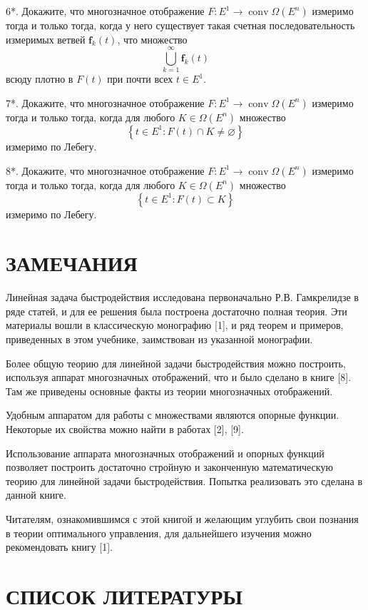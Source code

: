 \documentclass[8pt]{extarticle}
\begin{document}
6*. Докажите, что многозначное отображение \(F : E^1 \rightarrow \operatorname{conv}\Omega\left( E^n \right)\) измеримо тогда и только тогда, когда у него существует такая счетная последовательность измеримых ветвей \(\mathbf{f}_k(t)\), что множество
\[
\bigcup_{k=1}^{\infty}\mathbf{f}_k(t)
\]
всюду плотно в \(F(t)\) при почти всех \(t \in E^1\).

7*. Докажите, что многозначное отображение \(F : E^1 \rightarrow \operatorname{conv}\Omega\left( E^n \right)\) измеримо тогда и только тогда, когда для любого \(K \in \Omega\left( E^n \right)\) множество
\[
\left\{ t \in E^1 : F(t) \cap K \neq \varnothing \right\}
\]
измеримо по Лебегу.

8*. Докажите, что многозначное отображение \(F : E^1 \rightarrow \operatorname{conv}\Omega\left( E^n \right)\) измеримо тогда и только тогда, когда для любого \(K \in \Omega\left( E^n \right)\) множество
\[
\left\{ t \in E^1 : F(t) \subset K \right\}
\]
измеримо по Лебегу.

\section*{ЗАМЕЧАНИЯ}

Линейная задача быстродействия исследована первоначально Р.В. Гамкрелидзе в ряде статей, и для ее решения была построена достаточно полная теория. Эти материалы вошли в классическую монографию [1], и ряд теорем и примеров, приведенных в этом учебнике, заимствован из указанной монографии.

Более общую теорию для линейной задачи быстродействия можно построить, используя аппарат многозначных отображений, что и было сделано в книге [8]. Там же приведены основные факты из теории многозначных отображений.

Удобным аппаратом для работы с множествами являются опорные функции. Некоторые их свойства можно найти в работах [2], [9].

Использование аппарата многозначных отображений и опорных функций позволяет построить достаточно стройную и законченную математическую теорию для линейной задачи быстродействия. Попытка реализовать это сделана в данной книге.

Читателям, ознакомившимся с этой книгой и желающим углубить свои познания в теории оптимального управления, для дальнейшего изучения можно рекомендовать книгу [1].

\section*{СПИСОК ЛИТЕРАТУРЫ}
\end{document}
